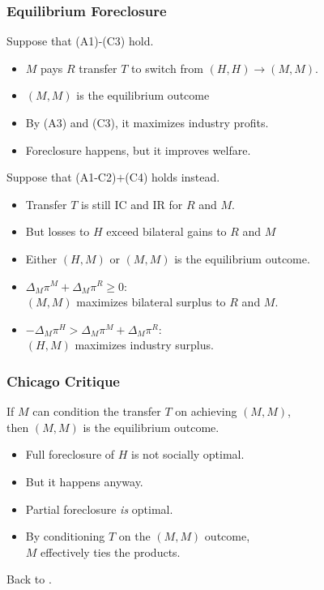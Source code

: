 \begin{frame}
\frametitle{Equilibrium Foreclosure}
\small
Suppose that (A1)-(C3) hold. 
\begin{itemize}
\item $M$ pays $R$ transfer $T$ to switch from $(H,H) \rightarrow (M,M)$.
\item $(M,M)$ is the equilibrium outcome 
\item By (A3) and (C3), it maximizes industry profits.
\item Foreclosure happens, but it improves welfare. %
\end{itemize}
\pause
Suppose that (A1-C2)$+$(C4) holds instead.
\begin{itemize}
\item Transfer $T$ is still IC and IR for $R$ and $M$.
\item But losses to $H$ exceed bilateral gains to $R$ and $M$
\item Either $(H,M)$ or $(M,M)$ is the equilibrium outcome.
\item $\Delta_M \pi^M + \Delta_M \pi^R \geq 0$:\\ 
$(M,M)$ maximizes \alert{bilateral surplus} to $R$ and $M$.
\item $-\Delta_M \pi^H  > \Delta_M \pi^M + \Delta_M \pi^R$: \\
$(H,M)$ maximizes \alert{industry surplus}.
\end{itemize}
\end{frame}

\begin{frame}
\frametitle{Chicago Critique}

If $M$ can condition the transfer $T$ on achieving $(M,M)$, \\
then $(M,M)$ is the equilibrium outcome.
\begin{itemize}
\item Full foreclosure of $H$ is \alert{not socially optimal}.
\item But it happens anyway.  
\item Partial foreclosure {\it is} optimal.
\item By conditioning $T$ on the $(M,M)$ outcome, \\ $M$ effectively ties the products.
\end{itemize}
Back to \hyperlink{intuition}{}.
\end{frame}

